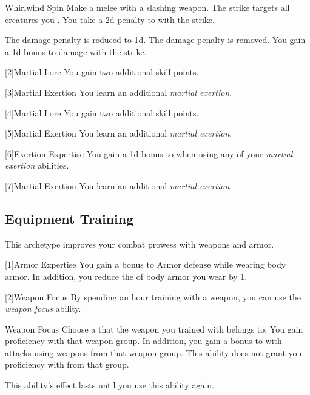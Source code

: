 {            \begin{ability}{Whirlwind Spin}
                Make a melee  with a slashing weapon.
                The strike targets all creatures you .
                You take a \minus2d penalty to  with the strike.

                \rankline
                 The damage penalty is reduced to \minus1d.
                 The damage penalty is removed.
                 You gain a \plus1d bonus to damage with the strike.
            \end{ability}
        }

        [2]{Martial Lore} You gain two additional skill points.

        [3]{Martial Exertion}
        You learn an additional \textit{martial exertion}.

        [4]{Martial Lore} You gain two additional skill points.

        [5]{Martial Exertion} 
        You learn an additional \textit{martial exertion}.

        [6]{Exertion Expertise} You gain a \plus1d bonus to  when using any of your \textit{martial exertion} abilities.

        [7]{Martial Exertion}
        You learn an additional \textit{martial exertion}.

    \subsection{Equipment Training}
        This archetype improves your combat prowess with weapons and armor.

        [1]{Armor Expertise}
        You gain a  bonus to Armor defense while wearing body armor.
        In addition, you reduce the  of body armor you wear by 1.

        [2]{Weapon Focus} By spending an hour training with a weapon, you can use the \textit{weapon focus} ability.
        \begin{ability}{Weapon Focus}
            Choose a  that the weapon you trained with belongs to.
            You gain proficiency with that weapon group.
            In addition, you gain a  bonus to  with attacks using weapons from that weapon group.
            This ability does not grant you proficiency with  from that group.

            This ability's effect lasts until you use this ability again.
        \end{ability}

